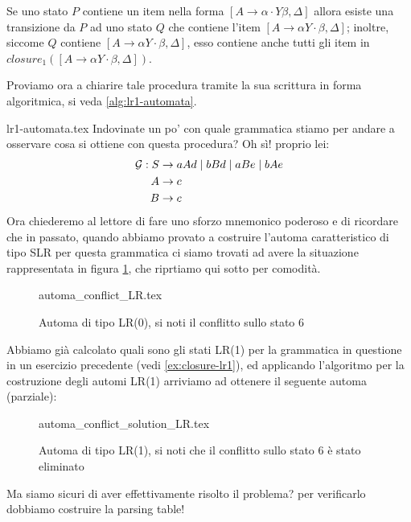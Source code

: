 \documentclass[class=book, crop=false, oneside, 12pt]{standalone}
\begin{document}
\noindent Se uno stato \(P\) contiene un item nella forma \([A \to \alpha \cdot Y \beta, \Delta]\) allora esiste una transizione da \(P\) ad uno stato \(Q\) che contiene l'item \([A \to \alpha Y \cdot \beta , \Delta]\); inoltre, siccome \(Q\) contiene \([A \to \alpha Y \cdot \beta , \Delta]\), esso contiene anche tutti gli item in \(closure_1([A \to \alpha Y \cdot \beta , \Delta])\).

Proviamo ora a chiarire tale procedura tramite la sua scrittura in forma algoritmica, si veda \ref{alg:lr1-automata}.

{lr1-automata.tex}
Indovinate un po' con quale grammatica stiamo per andare a osservare cosa si ottiene con questa procedura? Oh sì! proprio lei:
\begin{align}
    \label{eq:ex3-slr1-grammarrrrrr-again-and-again}
    \mathcal{G}: S &\to aAd \mid bBd \mid aBe \mid bAe \\
    A &\to c \nonumber \\ \notag
    B &\to c \notag
\end{align}
Ora chiederemo al lettore di fare uno sforzo mnemonico poderoso e di ricordare che in passato, quando abbiamo provato a costruire l'automa caratteristico di tipo SLR per questa grammatica ci siamo trovati ad avere la situazione rappresentata in figura \ref{fig:lr0-automata_conflict}, che riprtiamo qui sotto per comodità.
\begin{figure}[H]
    \centering
    {automa_conflict_LR.tex}
    \caption{Automa di tipo LR(0), si noti il conflitto sullo stato 6}
    \label{fig:lr0-automata_conflict}
\end{figure}
Abbiamo già calcolato quali sono gli stati LR(1) per la grammatica in questione in un esercizio precedente (vedi \ref{ex:closure-lr1}), ed applicando l'algoritmo per la costruzione degli automi LR(1) arriviamo ad ottenere il seguente automa (parziale):
\begin{figure}[H]
    \centering
    {automa_conflict_solution_LR.tex}
    \caption{Automa di tipo LR(1), si noti che il conflitto sullo stato 6 è stato eliminato}
    \label{fig:lr1-automata_no-conflict}
\end{figure}
Ma siamo sicuri di aver effettivamente risolto il problema? per verificarlo dobbiamo costruire la parsing table!
\end{document}
